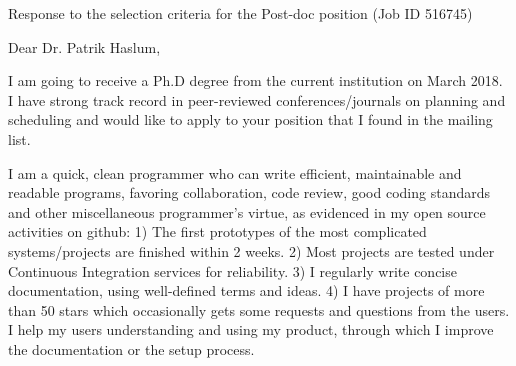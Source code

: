 \documentclass[12pt]{letter}
\begin{document}
{
\large
Response to the selection criteria for the Post-doc position (Job ID 516745)\\
}

Dear Dr. Patrik Haslum,

\vspace{1em}

\setlength{\parskip}{0.3em}




I am going to receive a Ph.D degree from the current institution on March 2018.
I have strong track record in peer-reviewed conferences/journals on planning and scheduling
and would like to apply to your position that I found in the mailing list.

I am a quick, clean programmer who can write efficient, maintainable and readable programs,
favoring collaboration, code review, good coding standards and other miscellaneous programmer's virtue,
as evidenced in my open source activities on github:
1) The first prototypes of the most complicated systems/projects are finished within 2 weeks.
2) Most projects are tested under Continuous Integration services for reliability.
3) I regularly write concise documentation, using well-defined terms and ideas.
4) I have projects of more than 50 stars which occasionally gets some requests and questions from the users.
 I help my users understanding and using my product, through which I improve the documentation or the setup process.
\end{document}

